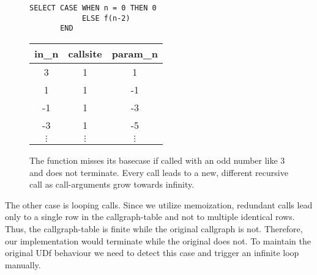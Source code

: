 \begin{figure}[h!]\small
    \begin{minipage}[b]{.5\linewidth}
    \centering
    \begin{verbatim}
SELECT CASE WHEN n = 0 THEN 0
            ELSE f(n-2)
       END
    \end{verbatim}
    \label{fig:infinite_callstack_udf}\par\vfill
    \end{minipage}%
    \begin{minipage}[b]{.5\linewidth}
    \centering
    \begin{tabular}{c|c|c}
in\_n & callsite & param\_n \\\hline
3  & 1 &  1 \\
1  & 1 & -1 \\
-1 & 1 & -3 \\
-3 & 1 & -5 \\
$\vdots$ & $\vdots$ & $\vdots$
    \end{tabular}
    \label{fig:infinite_callstack_callstack}
    \end{minipage}
    \caption{The function misses its basecase if called with an odd number like 3 and does not terminate. Every call leads to a new, different recursive call as call-arguments grow towards infinity.}\label{fig:infinite_callstack}
\end{figure}

The other case is looping calls. Since we utilize memoization, redundant calls lead only to a single row in the callgraph-table and not to multiple identical rows. Thus, the callgraph-table is finite while the original callgraph is not. Therefore, our implementation would terminate while the original does not. To maintain the original UDf behaviour we need to detect this case and trigger an infinite loop manually.

